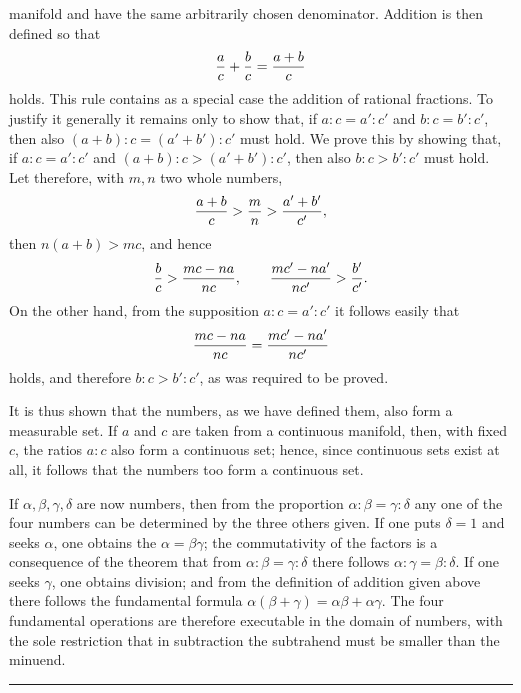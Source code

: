 manifold and have the same arbitrarily chosen denominator. Addition is
then defined so that
\[
 {a\over c}+{b\over c}={a+b\over c}
\]
holds.
This rule contains as a special case the addition of rational
fractions. To justify it generally it remains only to show that, if
$a:c=a':c'$ and $b:c=b':c'$, then also
$(a+b):c=(a'+b'):c'$ must hold. We prove this by showing that, if
$a:c=a':c'$ and $(a+b):c>(a'+b'):c'$, then also $b:c>b':c'$ must
hold. Let therefore, with $m,n$ two whole numbers,
\[
 {a+b\over c}>{m\over n}>{a'+b'\over c'},
\]
then $n(a+b)>mc$, and hence
\[
 {b\over c}>{mc-na\over nc},
 \qquad {mc'-na'\over nc'}>{b'\over c'}.
\]
On the other hand, from the supposition $a:c=a':c'$ it follows easily
that
\[
 {mc-na\over nc}={mc'-na'\over nc'}
\]
holds, and therefore $b:c>b':c'$, as was required to be proved.

It is thus shown that the numbers, as we have defined them, also form a
measurable set. If $a$ and $c$ are taken from a continuous manifold,
then, with fixed $c$, the ratios $a:c$ also form a continuous set;
hence, since continuous sets exist at all, it follows that the numbers
too form a continuous set.

If $\alpha,\beta,\gamma,\delta$ are now numbers, then from the
proportion $\alpha:\beta=\gamma:\delta$ any one of the four numbers
can be determined by the three others given. If one puts $\delta=1$
and seeks $\alpha$, one obtains the 
$\alpha=\beta\gamma$; the commutativity of the factors is a consequence
of the theorem that from $\alpha:\beta=\gamma:\delta$ there follows
$\alpha:\gamma=\beta:\delta$. If one seeks $\gamma$, one obtains
division; and from the definition of addition given above
there follows the fundamental formula
$\alpha(\beta+\gamma)=\alpha\beta+\alpha\gamma$. The four fundamental
operations are therefore executable in the domain of numbers, with the
sole restriction that in subtraction the subtrahend must be smaller
than the minuend.

\begin{center}
\rule{0.18\linewidth}{0.4pt}
\end{center}
